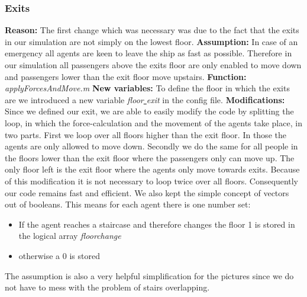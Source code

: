 \documentclass[11pt]{article}
\begin{document}
\subsubsection{Exits}
\textbf{Reason:}
\newline
The first change which was necessary was due to the fact that the exits in our simulation are not simply on the lowest floor.
\newline
\textbf{Assumption:}
\newline
In case of an emergency all agents are keen to leave the ship as fast as possible. Therefore in our simulation all passengers above the exits floor are only enabled to move down and passengers lower than the exit floor move upstairs.
\newline
\textbf{Function:}
\newline
\textit{applyForcesAndMove.m}
\newline
\textbf{New variables:}
\newline 
To define the floor in which the exits are we introduced a new variable \textit{floor\underline{ }exit} in the config file.
\newline
\textbf{Modifications:}
\newline
Since we defined our exit, we are able to easily modify the code by splitting the loop, in which the force-calculation and the movement of the agents take place, in two parts. First we loop over all floors higher than the exit floor. In those the agents are only allowed to move down. Secondly we do the same for all people in the floors lower than the exit floor where the passengers only can move up. The only floor left is the exit floor where the agents only move towards exits.
\newline
Because of this modification it is not necessary to loop twice over all floors. Consequently our code remains fast and efficient. We also kept the simple concept of vectors out of booleans. This means for each agent there is one number set: 
\begin{itemize}
\item If the agent reaches a staircase and therefore changes the floor 1 is stored in the logical array \textit{floorchange}
\item otherwise a 0 is stored
\end{itemize}
The assumption is also a very helpful simplification for the pictures since we do not have to mess with the problem of stairs overlapping.
\end{document}
